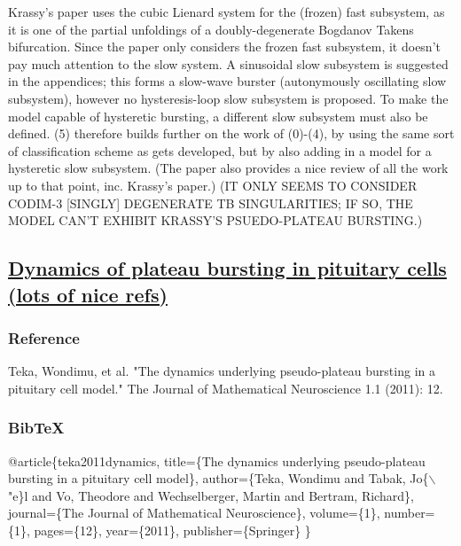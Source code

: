 \documentclass[11pt]{article}
\begin{document}
Krassy's paper uses the cubic Lienard system for the (frozen) fast subsystem, as it is one of the partial unfoldings of a doubly-degenerate Bogdanov Takens bifurcation.
Since the paper only considers the frozen fast subsystem, it doesn't pay much attention to the slow system.
A sinusoidal slow subsystem is suggested in the appendices; this forms a slow-wave burster (autonymously oscillating slow subsystem), however no hysteresis-loop slow subsystem is proposed.
To make the model capable of hysteretic bursting, a different slow subsystem must also be defined.
(5) therefore builds further on the work of (0)-(4), by using the same sort of classification scheme as gets developed, but by also adding in a model for a hysteretic slow subsystem.
(The paper also provides a nice review of all the work up to that point, inc. Krassy's paper.)
(IT ONLY SEEMS TO CONSIDER CODIM-3 [SINGLY] DEGENERATE TB SINGULARITIES; IF SO, THE MODEL CAN'T EXHIBIT KRASSY'S PSUEDO-PLATEAU BURSTING.)

\subsection{\href{https://link.springer.com/article/10.1186/2190-8567-1-12}{Dynamics of plateau bursting in pituitary cells (lots of nice refs)}}
\label{sec:org5b5b97a}
\subsubsection{Reference}
\label{sec:orgc3d0e65}
Teka, Wondimu, et al. "The dynamics underlying pseudo-plateau bursting in a pituitary cell model." The Journal of Mathematical Neuroscience 1.1 (2011): 12.

\subsubsection{BibTeX}
\label{sec:orga05f07b}
@article\{teka2011dynamics,
  title=\{The dynamics underlying pseudo-plateau bursting in a pituitary cell model\},
  author=\{Teka, Wondimu and Tabak, Jo\{$\backslash$"e\}l and Vo, Theodore and Wechselberger, Martin and Bertram, Richard\},
  journal=\{The Journal of Mathematical Neuroscience\},
  volume=\{1\},
  number=\{1\},
  pages=\{12\},
  year=\{2011\},
  publisher=\{Springer\}
\}
\end{document}
